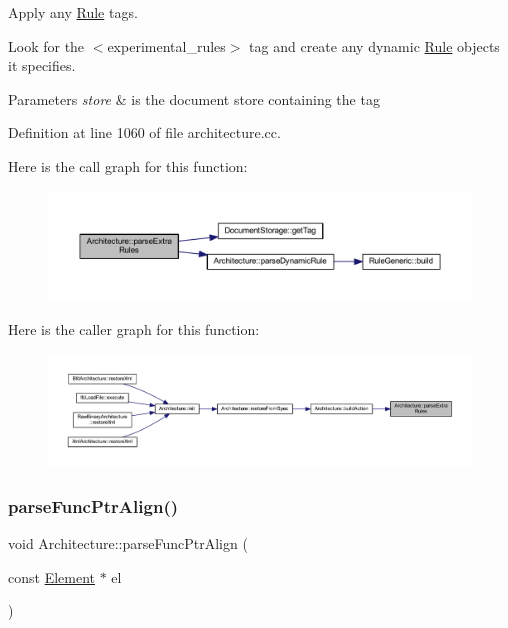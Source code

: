 Apply any \mbox{\hyperlink{class_rule}{Rule}} tags. 

Look for the $<$experimental\+\_\+rules$>$ tag and create any dynamic \mbox{\hyperlink{class_rule}{Rule}} objects it specifies. 
\begin{DoxyParams}{Parameters}
{\em store} & is the document store containing the tag \\
\hline
\end{DoxyParams}


Definition at line 1060 of file architecture.\+cc.

Here is the call graph for this function\+:
\nopagebreak
\begin{figure}[H]
\begin{center}
\leavevmode
\includegraphics[width=350pt]{class_architecture_a568ff11996bb679327d3d83dbb50d454_cgraph}
\end{center}
\end{figure}
Here is the caller graph for this function\+:
\nopagebreak
\begin{figure}[H]
\begin{center}
\leavevmode
\includegraphics[width=350pt]{class_architecture_a568ff11996bb679327d3d83dbb50d454_icgraph}
\end{center}
\end{figure}
\mbox{\label{class_architecture_a5e10589073ea41018047b8affb10025e}} 
\subsubsection{\texorpdfstring{parseFuncPtrAlign()}{parseFuncPtrAlign()}}
{\footnotesize\ttfamily void Architecture\+::parse\+Func\+Ptr\+Align (\begin{DoxyParamCaption}\item[{const \mbox{\hyperlink{class_element}{Element}} $\ast$}]{el }\end{DoxyParamCaption})\hspace{0.3cm}{\ttfamily [protected]}}



